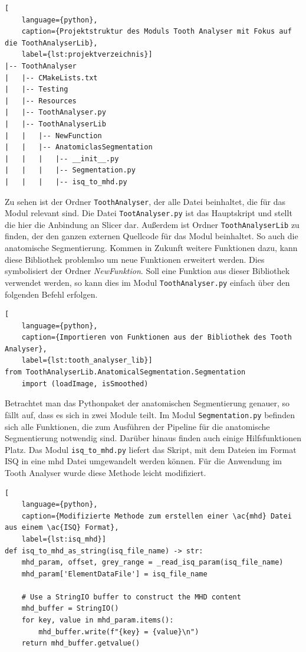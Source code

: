 \begin{lstlisting}[
    language={python},
    caption={Projektstruktur des Moduls Tooth Analyser mit Fokus auf die ToothAnalyserLib},
    label={lst:projektverzeichnis}]
|-- ToothAnalyser
|   |-- CMakeLists.txt
|   |-- Testing
|   |-- Resources
|   |-- ToothAnalyser.py
|   |-- ToothAnalyserLib
|   |   |-- NewFunction
|   |   |-- AnatomiclasSegmentation
|   |   |   |-- __init__.py
|   |   |   |-- Segmentation.py
|   |   |   |-- isq_to_mhd.py
\end{lstlisting}

Zu sehen ist der Ordner \texttt{ToothAnalyser}, der alle Datei beinhaltet, die
für das Modul relevant sind. Die Datei \texttt{TootAnalyser.py} ist das
Hauptskript und stellt die hier die Anbindung an Slicer dar. Außerdem ist Ordner
\texttt{ToothAnalyserLib} zu finden, der den ganzen externen Quellcode für das Modul
beinhaltet. So auch die anatomische Segmentierung. Kommen in Zukunft weitere Funktionen
dazu, kann diese Bibliothek problemlso um neue Funktionen erweitert werden. Dies
symbolisiert der Ordner \textsl{NewFunktion}. Soll eine Funktion aus dieser Bibliothek
verwendet werden, so kann dies im Modul \texttt{ToothAnalyser.py} einfach über den
folgenden Befehl erfolgen.

\begin{lstlisting}[
    language={python},
    caption={Importieren von Funktionen aus der Bibliothek des Tooth Analyser},
    label={lst:tooth_analyser_lib}]
from ToothAnalyserLib.AnatomicalSegmentation.Segmentation
	import (loadImage, isSmoothed)
\end{lstlisting}

Betrachtet man das Pythonpaket der anatomischen Segmentierung genauer, so fällt auf,
dass es sich in zwei Module teilt. Im Modul \texttt{Segmentation.py} befinden
sich alle Funktionen, die zum Ausführen der Pipeline für die anatomische Segmentierung
notwendig sind. Darüber hinaus finden auch einige Hilfsfunktionen Platz. Das Modul
\texttt{isq\_to\_mhd.py} liefert das Skript, mit dem Dateien im Format \ac{ISQ}
in eine \ac{mhd} Datei umgewandelt werden können. Für die Anwendung im Tooth
Analyser wurde diese Methode leicht modifiziert.

\begin{lstlisting}[
    language={python},
    caption={Modifizierte Methode zum erstellen einer \ac{mhd} Datei aus einem \ac{ISQ} Format},
    label={lst:isq_mhd}]
def isq_to_mhd_as_string(isq_file_name) -> str:
    mhd_param, offset, grey_range = _read_isq_param(isq_file_name)
    mhd_param['ElementDataFile'] = isq_file_name

    # Use a StringIO buffer to construct the MHD content
    mhd_buffer = StringIO()
    for key, value in mhd_param.items():
        mhd_buffer.write(f"{key} = {value}\n")
    return mhd_buffer.getvalue()
\end{lstlisting}

